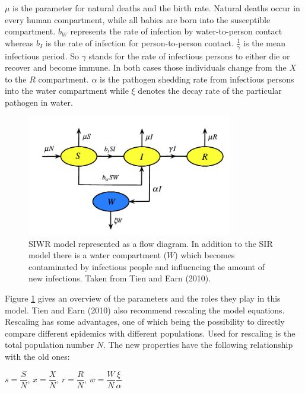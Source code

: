 \documentclass[11pt]{article}
\begin{document}
$ \mu $ is the parameter for natural deaths and the birth rate. Natural deaths occur in every human compartment, while all babies are born into the susceptible compartment. $ b_{W} $ represents the rate of infection by water-to-person contact whereas $ b_{I} $ is the rate of infection for person-to-person contact. $\frac{1}{\gamma } $ is the mean infectious period. So $ \gamma $ stands for the rate of infectious persons to either die or recover and become immune. In both cases those individuals change from the $ X $ to the $ R $ compartment. $ \alpha $ is the pathogen shedding rate from infectious persons into the water compartment while $ \xi $ denotes the decay rate of the particular pathogen in water.


\begin{center}
\begin{figure}
\includegraphics[width=0.8\textwidth]{Bilder/flow_diagram_SIWR.png}
\caption{SIWR model represented as a flow diagram. In addition to the SIR model there is a water compartment ($ W $) which becomes contaminated by infectious people and influencing the amount of new infections. Taken from Tien and Earn (2010).}
\label{pic:flow_diagram}
\end{figure}
\end{center}

Figure \ref{pic:flow_diagram} gives an overview of the parameters and the roles they play in this model. Tien and Earn (2010) also recommend rescaling the model equations. Rescaling has some advantages, one of which being the possibility to directly compare different epidemics with different populations. Used for rescaling is the total population number $ N $. The new properties have the following relationship with the old ones: \\
\newline

\begin{center}
$ s=\dfrac{S}{N} $,	$ x=\dfrac{X}{N} $,	$ r=\dfrac{R}{N} $,	$ w=\dfrac{W}{N}\dfrac{\xi}{\alpha} $
\end{center}
\newline
\end{document}
